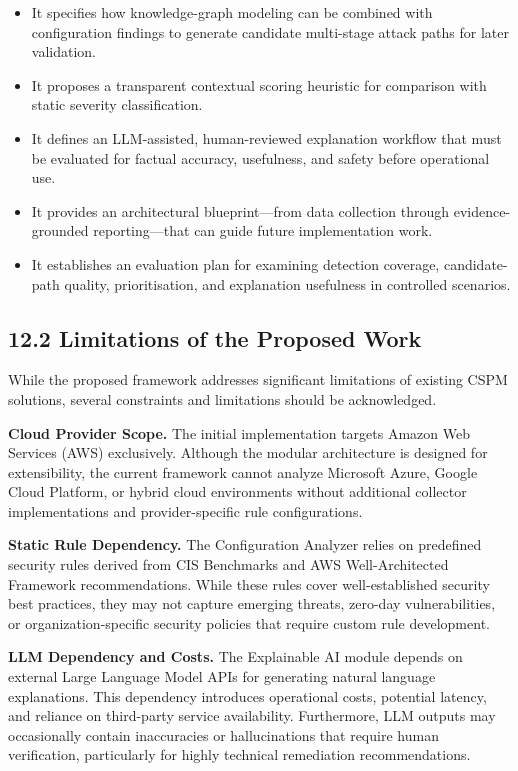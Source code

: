 \begin{itemize}
\tightlist
\item
  It specifies how knowledge-graph modeling can be combined with configuration findings to generate candidate multi-stage attack paths for later validation.\\
\item
  It proposes a transparent contextual scoring heuristic for comparison with static severity classification.\\
\item
  It defines an LLM-assisted, human-reviewed explanation workflow that must be evaluated for factual accuracy, usefulness, and safety before operational use.\\
\item
  It provides an architectural blueprint---from data collection through evidence-grounded reporting---that can guide future implementation work.\\
\item
  It establishes an evaluation plan for examining detection coverage, candidate-path quality, prioritisation, and explanation usefulness in controlled scenarios.
\end{itemize}

\subsection{12.2 Limitations of the Proposed Work}

While the proposed framework addresses significant limitations of existing CSPM solutions, several constraints and limitations should be acknowledged.

\textbf{Cloud Provider Scope.} The initial implementation targets Amazon Web Services (AWS) exclusively. Although the modular architecture is designed for extensibility, the current framework cannot analyze Microsoft Azure, Google Cloud Platform, or hybrid cloud environments without additional collector implementations and provider-specific rule configurations.

\textbf{Static Rule Dependency.} The Configuration Analyzer relies on predefined security rules derived from CIS Benchmarks and AWS Well-Architected Framework recommendations. While these rules cover well-established security best practices, they may not capture emerging threats, zero-day vulnerabilities, or organization-specific security policies that require custom rule development.

\textbf{LLM Dependency and Costs.} The Explainable AI module depends on external Large Language Model APIs for generating natural language explanations. This dependency introduces operational costs, potential latency, and reliance on third-party service availability. Furthermore, LLM outputs may occasionally contain inaccuracies or hallucinations that require human verification, particularly for highly technical remediation recommendations.

